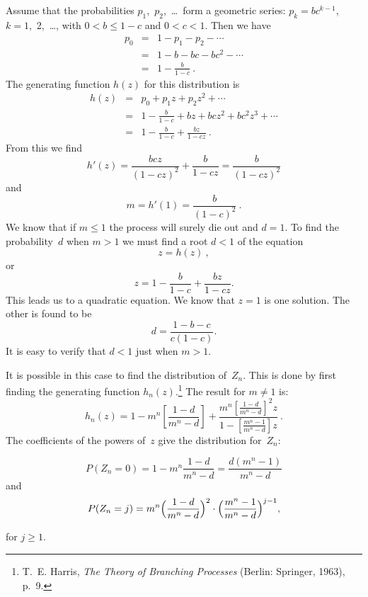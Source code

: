 \begin{example}\label{exam 10.2.4}
Assume that the probabilities $p_1$,~$p_2$,~\ldots\ form a geometric series:
$p_k = bc^{k - 1}$, $k = 1$,~2,~\ldots, with $0 < b \leq 1 - c$ and $0 < c < 1$. Then we have
\begin{eqnarray*}
p_0 &=& 1 - p_1 - p_2 -\cdots \\
    &=& 1 - b - bc - bc^2 -\cdots \\
    &=& 1 - \frac b{1 - c}\ .
\end{eqnarray*}
The generating function $h(z)$ for this distribution is
\begin{eqnarray*}
h(z) &=& p_0 + p_1z + p_2z^2 +\cdots \\
     &=& 1 - \frac b{1 - c} + bz + bcz^2 + bc^2z^3 +\cdots \\
     &=& 1 - \frac b{1 - c} + \frac{bz}{1 - cz}\ .
\end{eqnarray*}
From this we find
$$
h'(z) = \frac{bcz}{(1 - cz)^2} + \frac b{1 - cz} = \frac b{(1 - cz)^2}
$$
and
$$
m = h'(1) = \frac b{(1 - c)^2}\ .
$$
We know that if $m \leq 1$ the process will surely die out and $d = 1$.  To
find the probability~$d$ when $m > 1$ we must find a root $d < 1$ of the equation
$$
z = h(z)\ ,
$$
or
$$
z = 1 - \frac b{1 - c} + \frac{bz}{1 - cz}.
$$
This leads us to a quadratic equation.  We know that $z = 1$ is one solution. 
The other is found to be
$$
d = \frac{1 - b - c}{c(1 - c)}.
$$
It is easy to verify that $d < 1$ just when $m > 1$.

It is possible in this case to find the distribution of~$Z_n$.  This is done by
first finding the generating function $h_n(z)$.\footnote{T.~E. Harris, {\it
The Theory of Branching Processes} (Berlin: Springer, 1963), p.~9.}  The
result for $m \ne 1$ is:
$$
h_n(z) = 1 - m^n \left[\frac{1 - d}{m^n - d}\right] + 
\frac{m^n \left[\frac{1 - d}{m^n - d}\right]^2 z}
{1 - \left[\frac{m^n - 1}{m^n - d}\right]z}\ .
$$
The coefficients of the powers of~$z$ give the distribution for~$Z_n$:
 
$$P(Z_n = 0) = 1 - m^n\frac{1 - d}{m^n - d} = \frac{d(m^n - 1)}{m^n - d}$$
\noindent and 
$$P(Z_n = j) = m^n \Bigl(\frac{1 - d}{m^n - d}\Bigr)^2 \cdot 
\Bigl(\frac{m^n - 1}{ m^n - d}\Bigr)^{j - 1},$$

\noindent for $j \geq 1$.
\end{example}

